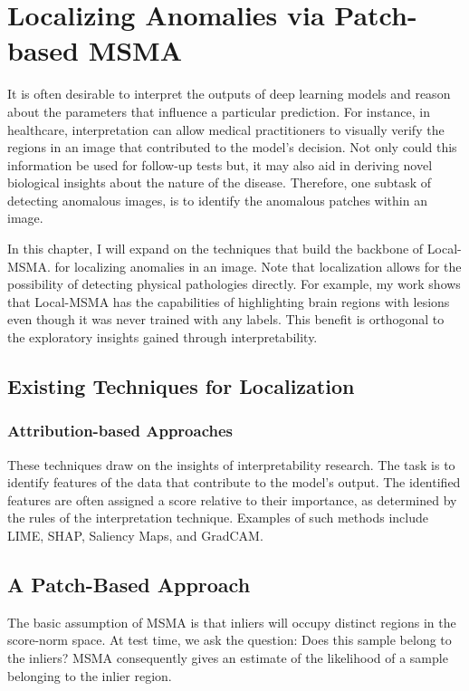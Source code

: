 \chapter{Localizing Anomalies via Patch-based MSMA}
\label{ch:localizing}

It is often desirable to interpret the outputs of deep learning models and reason about the parameters that influence a particular prediction. For instance, in healthcare, interpretation can allow medical practitioners 
to visually verify the regions in an image that contributed to the model's decision. Not only could this information be used for follow-up tests but, it may also aid in deriving novel biological insights about the nature of the disease. Therefore, one subtask of detecting anomalous images, is to identify the anomalous patches within an image.

In this chapter, I will expand on the techniques that build the backbone of Local-MSMA. for localizing anomalies in an image. Note that localization allows for the possibility of detecting physical pathologies directly. For example, my work shows that Local-MSMA has the capabilities of highlighting brain regions with lesions even though it was never trained with any labels. This benefit is orthogonal to the exploratory insights gained through interpretability.

\section{Existing Techniques for Localization}

\subsection*{Attribution-based Approaches}
These techniques draw on the insights of interpretability research. The task is to identify features of the data that contribute to the model's output. The identified features are often assigned a score relative to their importance, as determined by the rules of the interpretation technique. Examples of such methods include LIME, SHAP, Saliency Maps, and GradCAM.


\section*{A Patch-Based Approach}
The basic assumption of MSMA is that inliers will occupy distinct regions in the score-norm space. At test time, we ask the question: Does this sample belong to the inliers? MSMA consequently gives an estimate of the likelihood of a sample belonging to the inlier region. 

